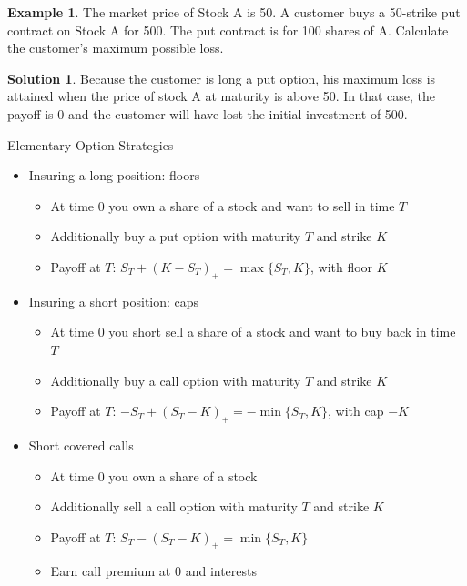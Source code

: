 \documentclass[10pt,handout]{beamer}
\theoremstyle{definition}
\newtheorem*{ex}{Example}
\newtheorem*{sol}{Solution}
\begin{document}
\begin{frame}
  \begin{ex}
    The market price of Stock A is 50. A customer buys a 50-strike put contract on Stock A for 500. The put contract is for 100 shares of A. Calculate the customer's maximum possible loss.
  \end{ex}
  \begin{sol}
    Because the customer is long a put option, his maximum loss is attained when the price of stock A at maturity is above 50. In that case, the payoff is 0 and the customer will have lost the initial investment of 500.
  \end{sol}
\end{frame}

\begin{frame}{Elementary Option Strategies}
  \begin{itemize}
    \item Insuring a long position: floors
      \begin{itemize}
        \item At time $0$ you own a share of a stock and want to sell in time $T$
        \item Additionally buy a put option with maturity $T$ and strike $K$
        \item Payoff at $T$: $S_T + (K - S_T)_+ = \max\{S_T, K\}$, with floor $K$
      \end{itemize}
    \item Insuring a short position: caps
      \begin{itemize}
        \item At time $0$ you short sell a share of a stock and want to buy back in time $T$
        \item Additionally buy a call option with maturity $T$ and strike $K$
        \item Payoff at $T$: $-S_T + (S_T - K)_+ = -\min\{S_T, K\}$, with cap $-K$
      \end{itemize}
    \item Short covered calls
      \begin{itemize}
        \item At time $0$ you own a share of a stock 
        \item Additionally sell a call option with maturity $T$ and strike $K$
        \item Payoff at $T$: $S_T - (S_T - K)_+ = \min\{S_T, K\}$ 
        \item Earn call premium at $0$ and interests
      \end{itemize}

\end{itemize}
\end{frame}
\end{document}

